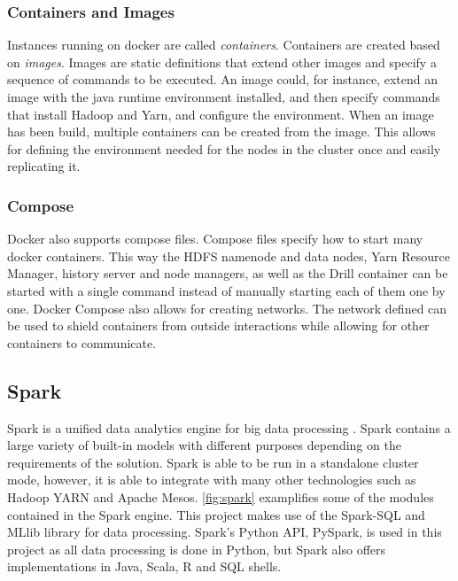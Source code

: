 \documentclass[main.tex]{subfiles}
\begin{document}
\subsubsection{Containers and Images}
Instances running on docker are called \textit{containers}. Containers are created based on \textit{images}. Images are static definitions that extend other images and specify a sequence of commands to be executed. An image could, for instance, extend an image with the java runtime environment installed, and then specify commands that install Hadoop and Yarn, and configure the environment. When an image has been build, multiple containers can be created from the image. This allows for defining the environment needed for the nodes in the cluster once and easily replicating it. 

\subsubsection{Compose}
Docker also supports compose files. Compose files specify how to start many docker containers. This way the HDFS namenode and data nodes, Yarn Resource Manager, history server and node managers, as well as the Drill container can be started with a single command instead of manually starting each of them one by one. Docker Compose also allows for creating networks. The network defined can be used to shield containers from outside interactions while allowing for other containers to communicate. 

\subsection{Spark}
Spark is a unified data analytics engine for big data processing \cite{spark}. Spark contains a large variety of built-in models with different purposes depending on the requirements of the solution. Spark is able to be run in a standalone cluster mode, however, it is able to integrate with many other technologies such as Hadoop YARN and Apache Mesos. \autoref{fig:spark} examplifies some of the modules contained in the Spark engine. This project makes use of the Spark-SQL and MLlib library for data processing. Spark's Python API, PySpark, is used in this project as all data processing is done in Python, but Spark also offers implementations in Java, Scala, R and SQL shells.
\end{document}
